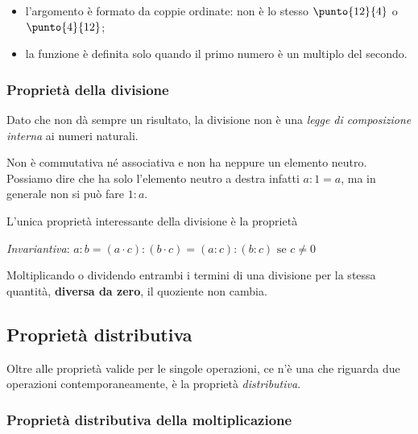 \vspace{-1em}
\begin{osservazione}
\begin{itemize} [nosep]
\item l'argomento è formato da coppie ordinate: non è lo stesso 
\(\punto{12}{4}\) o \(\punto{4}{12}\);
\item la funzione è definita solo quando il primo numero è un multiplo
del secondo.
\end{itemize}

\end{osservazione}

\subsubsection{Proprietà della divisione}

Dato che non dà sempre un risultato, la divisione non è una 
\emph{legge di composizione interna} ai numeri naturali. 

Non è commutativa né associativa e non ha neppure un elemento neutro.
Possiamo dire che ha solo l'elemento neutro a destra infatti \(a : 1 = a\), 
ma in generale non si può fare \(1 : a\).

L'unica proprietà interessante della divisione è la proprietà
\begin{itemize*}
 \item \emph{Invariantiva}: 
  \(a : b = (a \cdot c) : (b \cdot c) = (a : c) : (b : c) \text{ se } c \neq 
0\)
\end{itemize*}

\begin{definizione}
Moltiplicando o dividendo entrambi i termini di una divisione per 
la stessa quantità, \textbf{diversa da zero}, il quoziente non  cambia.
\end{definizione}

\subsection{Proprietà distributiva}

Oltre alle proprietà valide per le singole operazioni, ce n'è una che 
riguarda due operazioni contemporaneamente, è la proprietà 
\emph{distributiva}.

\subsubsection{Proprietà distributiva della moltiplicazione}

